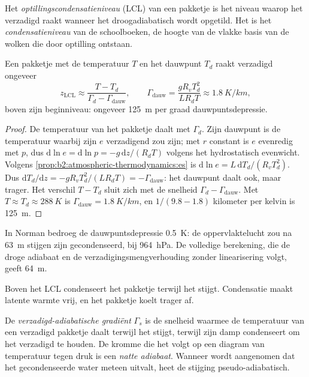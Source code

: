 \begin{definition}[Optillingscondensatieniveau]\label{def:b2:atmospheric-thermodynamics:lcl}
Het \emph{optillingscondensatieniveau} (LCL) van een pakketje is het
niveau waarop het verzadigd raakt wanneer het droogadiabatisch wordt opgetild. Het is het
\emph{condensatieniveau} van de schoolboeken, de hoogte van de
vlakke basis van de wolken die door optilling ontstaan.
\end{definition}

\begin{proposition}\label{prop:b2:atmospheric-thermodynamics:lcl}
Een pakketje met de temperatuur $T$ en het dauwpunt $T_d$ raakt verzadigd ongeveer
\[
  z_{\text{LCL}} \approx \frac{T - T_d}{\Gamma_d - \Gamma_{\text{dauw}}}, \qquad
  \Gamma_{\text{dauw}} = \frac{g R_v T_d^2}{L R_d T} \approx \qty{1.8}{K/km},
\]
boven zijn beginniveau: ongeveer \qty{125}{m} per graad dauwpuntsdepressie.
\end{proposition}

\begin{proof}
De temperatuur van het pakketje daalt met $\Gamma_d$. Zijn dauwpunt is de temperatuur waarbij zijn
 $e$ verzadigend zou zijn; met $r$ constant is $e$ evenredig met $p$, dus
$\mathrm{d}\ln e = \mathrm{d}\ln p = -g\,\mathrm{d}z/(R_dT)$ volgens het hydrostatisch evenwicht. Volgens
\cref{prop:b2:atmospheric-thermodynamics:es} is $\mathrm{d}\ln e = L\,\mathrm{d}T_d/(R_vT_d^2)$.
Dus $\mathrm{d}T_d/\mathrm{d}z = -gR_vT_d^2/(LR_dT) = -\Gamma_{\text{dauw}}$: het dauwpunt daalt
ook, maar trager. Het verschil $T - T_d$ sluit zich met de snelheid $\Gamma_d - \Gamma_{\text{dauw}}$. Met
$T \approx T_d \approx \qty{288}{K}$ is $\Gamma_{\text{dauw}} = \qty{1.8}{K/km}$, en $1/(9.8 - 1.8)$
kilometer per kelvin is \qty{125}{m}.
\end{proof}

In Norman bedroeg de dauwpuntsdepressie \qty{0.5}{K}: de oppervlaktelucht zou na
\qty{63}{m} stijgen zijn gecondenseerd, bij \qty{964}{hPa}. De volledige berekening, die de droge adiabaat en
de verzadigingsmengverhouding zonder linearisering volgt, geeft \qty{64}{m}.

Boven het LCL condenseert het pakketje terwijl het stijgt. Condensatie maakt latente warmte vrij, en het pakketje
koelt trager af.

\begin{definition}\label{def:b2:atmospheric-thermodynamics:moist-adiabat}
De \emph{verzadigd-adiabatische gradiënt} $\Gamma_s$ is
de snelheid waarmee de temperatuur van een verzadigd pakketje daalt terwijl het stijgt, terwijl zijn damp condenseert
om het verzadigd te houden. De kromme die het volgt op een diagram van temperatuur tegen druk is een
\emph{natte adiabaat}. Wanneer wordt aangenomen dat het gecondenseerde water meteen uitvalt,
heet de stijging pseudo-adiabatisch.
\end{definition}

